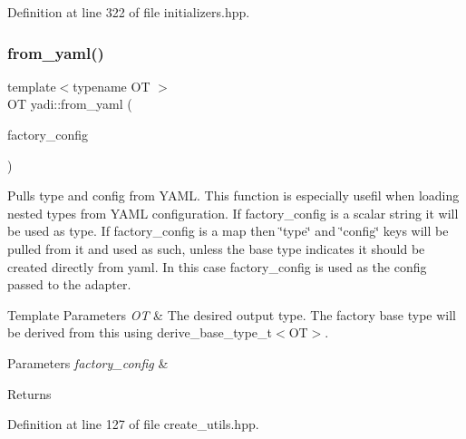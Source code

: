 Definition at line 322 of file initializers.\+hpp.

\mbox{\label{namespaceyadi_a85138aa0433192beaf4d0e67dd50cb23}} 
\subsubsection{\texorpdfstring{from\+\_\+yaml()}{from\_yaml()}}
{\footnotesize\ttfamily template$<$typename OT $>$ \\
OT yadi\+::from\+\_\+yaml (\begin{DoxyParamCaption}\item[{Y\+A\+M\+L\+::\+Node const \&}]{factory\+\_\+config }\end{DoxyParamCaption})}



Pulls type and config from Y\+A\+ML. This function is especially usefil when loading nested types from Y\+A\+ML configuration. If factory\+\_\+config is a scalar string it will be used as type. If factory\+\_\+config is a map then \char`\"{}type\char`\"{} and \char`\"{}config\char`\"{} keys will be pulled from it and used as such, unless the base type indicates it should be created directly from yaml. In this case factory\+\_\+config is used as the config passed to the adapter. 


\begin{DoxyTemplParams}{Template Parameters}
{\em OT} & The desired output type. The factory base type will be derived from this using derive\+\_\+base\+\_\+type\+\_\+t$<$\+O\+T$>$. \\
\hline
\end{DoxyTemplParams}

\begin{DoxyParams}{Parameters}
{\em factory\+\_\+config} & \\
\hline
\end{DoxyParams}
\begin{DoxyReturn}{Returns}

\end{DoxyReturn}


Definition at line 127 of file create\+\_\+utils.\+hpp.

\mbox{\label{namespaceyadi_a829744f635593fef1c05b0f9b01a8aa2}} 
